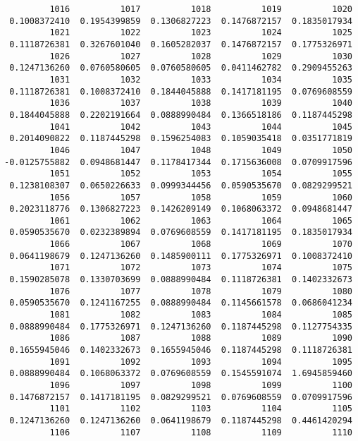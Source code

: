 \documentclass[
  letterpaper,
  DIV=11,
  numbers=noendperiod]{scrreprt}
\begin{document}
\begin{verbatim}
         1016          1017          1018          1019          1020 
 0.1008372410  0.1954399859  0.1306827223  0.1476872157  0.1835017934 
         1021          1022          1023          1024          1025 
 0.1118726381  0.3267601040  0.1605282037  0.1476872157  0.1775326971 
         1026          1027          1028          1029          1030 
 0.1247136260  0.0760580605  0.0760580605  0.0411462782  0.2909455263 
         1031          1032          1033          1034          1035 
 0.1118726381  0.1008372410  0.1844045888  0.1417181195  0.0769608559 
         1036          1037          1038          1039          1040 
 0.1844045888  0.2202191664  0.0888990484  0.1366518186  0.1187445298 
         1041          1042          1043          1044          1045 
 0.2014090822  0.1187445298  0.1596254083  0.1059035418  0.0351771819 
         1046          1047          1048          1049          1050 
-0.0125755882  0.0948681447  0.1178417344  0.1715636008  0.0709917596 
         1051          1052          1053          1054          1055 
 0.1238108307  0.0650226633  0.0999344456  0.0590535670  0.0829299521 
         1056          1057          1058          1059          1060 
 0.2023118776  0.1306827223  0.1426209149  0.1068063372  0.0948681447 
         1061          1062          1063          1064          1065 
 0.0590535670  0.0232389894  0.0769608559  0.1417181195  0.1835017934 
         1066          1067          1068          1069          1070 
 0.0641198679  0.1247136260  0.1485900111  0.1775326971  0.1008372410 
         1071          1072          1073          1074          1075 
 0.1590285078  0.1330703699  0.0888990484  0.1118726381  0.1402332673 
         1076          1077          1078          1079          1080 
 0.0590535670  0.1241167255  0.0888990484  0.1145661578  0.0686041234 
         1081          1082          1083          1084          1085 
 0.0888990484  0.1775326971  0.1247136260  0.1187445298  0.1127754335 
         1086          1087          1088          1089          1090 
 0.1655945046  0.1402332673  0.1655945046  0.1187445298  0.1118726381 
         1091          1092          1093          1094          1095 
 0.0888990484  0.1068063372  0.0769608559  0.1545591074  1.6945859460 
         1096          1097          1098          1099          1100 
 0.1476872157  0.1417181195  0.0829299521  0.0769608559  0.0709917596 
         1101          1102          1103          1104          1105 
 0.1247136260  0.1247136260  0.0641198679  0.1187445298  0.4461420294 
         1106          1107          1108          1109          1110 

\end{verbatim}
\end{document}
